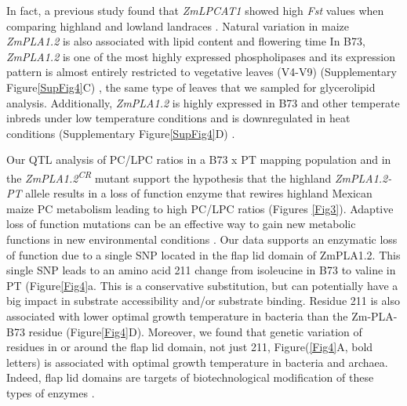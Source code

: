 \documentclass[9pt,twocolumn,twoside,lineno]{BioRxiv}
\begin{document}
In fact, a previous study found that \textit{ZmLPCAT1} showed high \textit{Fst} values when comparing highland and lowland landraces \cite{Takuno2015-uj}.
Natural variation in maize \textit{ZmPLA1.2} is also associated with lipid content \cite{Riedelsheimer2012-bx} and flowering time \cite{Chen2012-gg, Hung2012-ms} 
In B73, \textit{ZmPLA1.2} is one of the most highly expressed phospholipases and its expression pattern is almost entirely restricted to vegetative leaves (V4-V9) (Supplementary Figure\ref{SupFig4}C) \cite{Stelpflug2016-vr}, the same type of leaves that we sampled for glycerolipid analysis. 
Additionally, \textit{ZmPLA1.2} is highly expressed in B73 and other temperate inbreds under low temperature conditions and is downregulated in heat conditions (Supplementary Figure\ref{SupFig4}D) \cite{Waters2017-nat}.

Our QTL analysis of PC/LPC ratios in a B73 x PT mapping population and in the \textit{ZmPLA1.2\textsuperscript{CR}} mutant support the hypothesis that the highland \textit{ZmPLA1.2-PT} allele results in a loss of function enzyme that rewires highland Mexican maize PC metabolism leading to high PC/LPC ratios (Figures \ref{Fig3}). 
Adaptive loss of function mutations can be an effective way to gain new metabolic functions in new environmental conditions \cite{Hottes2013-np}. 
Our data supports an enzymatic loss of function due to a single SNP located in the flap lid domain of ZmPLA1.2.
This single SNP leads to an amino acid 211 change from isoleucine in B73 to valine in PT (Figure\ref{Fig4}a.
This is a conservative substitution, but can potentially have a big impact in substrate accessibility and/or substrate binding. 
Residue 211 is also associated with lower optimal growth temperature in bacteria than the Zm-PLA-B73 residue (Figure\ref{Fig4}D).
Moreover, we found that genetic variation of residues in or around the flap lid domain, not just 211, Figure(\ref{Fig4}A, bold letters) is associated with optimal growth temperature in bacteria and archaea. 
Indeed, flap lid domains are targets of biotechnological modification of these types of enzymes \cite{Khan2017-ua}.
\end{document}
